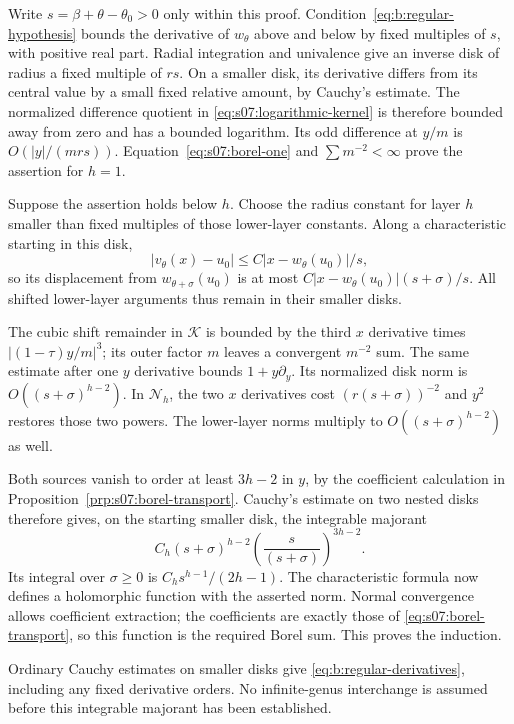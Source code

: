 \begin{prf}
Write $s=\beta+\theta-\theta_0>0$ only within this proof.
Condition~\eqref{eq:b:regular-hypothesis} bounds the derivative of
$w_\theta$ above and below by fixed multiples of $s$, with
positive real part. Radial integration and univalence give an inverse
disk of radius a fixed multiple of $r s$. On a smaller
disk, its derivative differs from its central value by a small fixed
relative amount, by Cauchy's estimate. The normalized difference
quotient in \eqref{eq:s07:logarithmic-kernel} is therefore bounded
away from zero and has a bounded logarithm. Its odd difference at
$y/m$ is $O(|y|/(m r s))$. Equation~\eqref{eq:s07:borel-one}
and $\sum m^{-2}<\infty$ prove the assertion for $h=1$.

Suppose the assertion holds below $h$. Choose the radius constant
for layer $h$ smaller than fixed multiples of those lower-layer
constants. Along a characteristic starting in this disk,
\[
 |v_\theta(x)-u_0|
       \leq C|x-w_\theta(u_0)|/s,
\]
so its displacement from $w_{\theta+\sigma}(u_0)$ is at most
$C|x-w_\theta(u_0)|(s+\sigma)/s$.
All shifted lower-layer arguments thus remain in their smaller disks.

The cubic shift remainder in $\mathcal K$ is bounded by the third
$x$ derivative times $|(1-\tau)y/m|^3$; its outer factor $m$
leaves a convergent $m^{-2}$ sum. The same estimate after one
$y$ derivative bounds $1+y\partial_y$. Its normalized disk norm
is $O((s+\sigma)^{h-2})$. In $\mathcal N_h$, the two
$x$ derivatives cost $(r (s+\sigma))^{-2}$ and $y^2$
restores those two powers. The lower-layer norms multiply to
$O((s+\sigma)^{h-2})$ as well.

Both sources vanish to order at least $3h-2$ in $y$, by the
coefficient calculation in Proposition~\ref{prp:s07:borel-transport}.
Cauchy's estimate on two nested disks therefore gives, on the
starting smaller disk, the integrable majorant
\begin{equation}\label{eq:b:regular-integral}
 C_h (s+\sigma)^{h-2}
         \left(\frac{s}{(s+\sigma)}\right)^{3h-2}.
\end{equation}
Its integral over $\sigma\geq0$ is
$C_h s^{h-1}/(2h-1)$. The characteristic formula now
defines a holomorphic function with the asserted norm. Normal
convergence allows coefficient extraction; the coefficients are
exactly those of \eqref{eq:s07:borel-transport}, so this function
is the required Borel sum. This proves the induction.

Ordinary Cauchy estimates on smaller disks give
\eqref{eq:b:regular-derivatives}, including any fixed derivative
orders. No infinite-genus interchange is assumed before this
integrable majorant has been established.
\end{prf}

